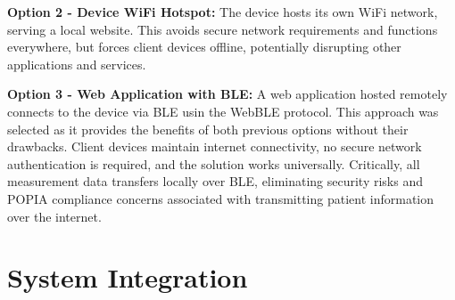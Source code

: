 \textbf{Option 2 - Device WiFi Hotspot:} The device hosts its own WiFi network, serving a local website. This avoids secure network requirements and functions everywhere, but forces client devices offline, potentially disrupting other applications and services.

\textbf{Option 3 - Web Application with BLE:} A web application hosted remotely connects to the device via \ac{BLE} usin the WebBLE protocol. This approach was selected as it provides the benefits of both previous options without their drawbacks. Client devices maintain internet connectivity, no secure network authentication is required, and the solution works universally. Critically, all measurement data transfers locally over \ac{BLE}, eliminating security risks and POPIA compliance concerns associated with transmitting patient information over the internet.

\section{System Integration}

\label{chap:design}